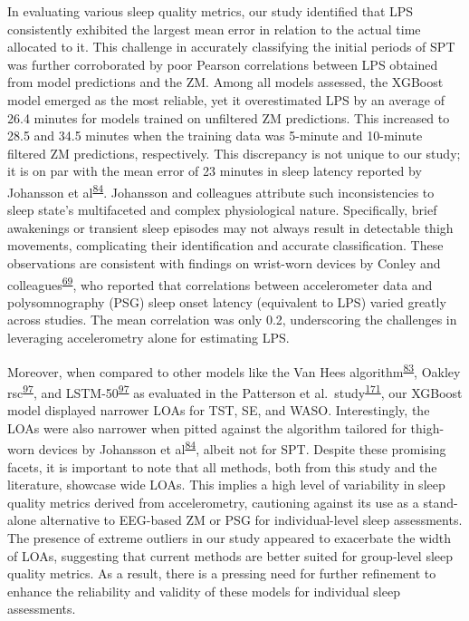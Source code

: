 \documentclass[
  10pt,
]{scrbook}
\begin{document}
In evaluating various sleep quality metrics, our study identified that
LPS consistently exhibited the largest mean error in relation to the
actual time allocated to it. This challenge in accurately classifying
the initial periods of SPT was further corroborated by poor Pearson
correlations between LPS obtained from model predictions and the ZM.
Among all models assessed, the XGBoost model emerged as the most
reliable, yet it overestimated LPS by an average of 26.4 minutes for
models trained on unfiltered ZM predictions. This increased to 28.5 and
34.5 minutes when the training data was 5-minute and 10-minute filtered
ZM predictions, respectively. This discrepancy is not unique to our
study; it is on par with the mean error of 23 minutes in sleep latency
reported by Johansson et
al\textsuperscript{\protect\hyperlink{ref-johansson_development_2023}{84}}.
Johansson and colleagues attribute such inconsistencies to sleep state's
multifaceted and complex physiological nature. Specifically, brief
awakenings or transient sleep episodes may not always result in
detectable thigh movements, complicating their identification and
accurate classification. These observations are consistent with findings
on wrist-worn devices by Conley and
colleagues\textsuperscript{\protect\hyperlink{ref-conley_agreement_2019}{69}},
who reported that correlations between accelerometer data and
polysomnography (PSG) sleep onset latency (equivalent to LPS) varied
greatly across studies. The mean correlation was only 0.2, underscoring
the challenges in leveraging accelerometry alone for estimating LPS.

Moreover, when compared to other models like the Van Hees
algorithm\textsuperscript{\protect\hyperlink{ref-hees_novel_2015}{83}},
Oakley
rsc\textsuperscript{\protect\hyperlink{ref-palotti_benchmark_2019}{97}},
and
LSTM-50\textsuperscript{\protect\hyperlink{ref-palotti_benchmark_2019}{97}}
as evaluated in the Patterson et
al.~study\textsuperscript{\protect\hyperlink{ref-patterson_40_2023}{171}},
our XGBoost model displayed narrower LOAs for TST, SE, and WASO.
Interestingly, the LOAs were also narrower when pitted against the
algorithm tailored for thigh-worn devices by Johansson et
al\textsuperscript{\protect\hyperlink{ref-johansson_development_2023}{84}},
albeit not for SPT. Despite these promising facets, it is important to
note that all methods, both from this study and the literature, showcase
wide LOAs. This implies a high level of variability in sleep quality
metrics derived from accelerometry, cautioning against its use as a
stand-alone alternative to EEG-based ZM or PSG for individual-level
sleep assessments. The presence of extreme outliers in our study
appeared to exacerbate the width of LOAs, suggesting that current
methods are better suited for group-level sleep quality metrics. As a
result, there is a pressing need for further refinement to enhance the
reliability and validity of these models for individual sleep
assessments.
\end{document}
